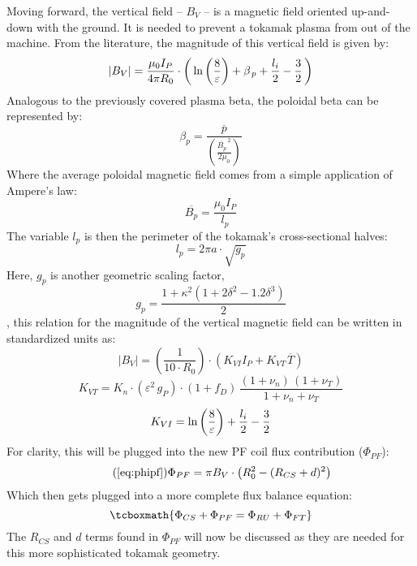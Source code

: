 Moving forward, the vertical field -- $B_V$ -- is a magnetic field oriented up-and-down with the ground. It is needed to prevent a tokamak plasma from  out of the machine. From the literature, the magnitude of this vertical field  is given by:\cite{process}
\begin{equation}
  |B_V| = \frac{\mu_0 I_P}{4 \pi R_0} \cdot \left( \,\textnormal{ln} \left(\frac{8}{\varepsilon}\right) + \beta_{\,p} + \frac{l_i}{2} - \frac{3}{2} \, \right)
\end{equation}
Analogous to the previously covered plasma beta, the poloidal beta can be represented by: \cite{elongation}
\begin{equation}
  \beta_p = \frac{\overline{p}}{\left( \frac{\overline{B_p}^{\,2}}{2 \mu_0} \right)}
\end{equation}
Where the average poloidal magnetic field comes from a simple application of Ampere's law:
\begin{equation}
	\overline{B_p} = \frac{\mu_0 I_P}{l_p}
\end{equation}
The variable $l_p$ is then the perimeter of the tokamak's cross-sectional halves:
\begin{equation}
	l_p = 2 \pi a \cdot \sqrt{g_p}
\end{equation}
Here, $g_p$ is another geometric scaling factor,
\begin{equation}
  g_p = \frac{1 + \kappa^2 ( 1 + 2 \delta^2 - 1.2\delta^3 )}{2}
\end{equation}
, this relation for the magnitude of the vertical magnetic field can be written in standardized units as:
\begin{equation}
	|B_V| = \left( \frac{ 1 }{ 10 \cdot R_0} \right) \cdot \left( K_{VI} I_P +  K_{VT\,} \overline{T}  \right)
\end{equation}
\begin{equation}
	K_{VT} = K_{n} \cdot ( \varepsilon ^ 2 \, g_P ) \cdot ( 1 + f_D ) \, \frac{ (1 + \nu_n) \, (1 + \nu_T) }{1 + \nu_n + \nu_T }
\end{equation}
\begin{equation}
	K_{VI} = \textnormal{ln} \left(\frac{8}{\varepsilon}\right) + \frac{l_i}{2} - \frac{3}{2}
\end{equation}
For clarity, this will be plugged into the new PF coil flux contribution ($\Phi_{PF}$):
\begin{equation}
	\tag{\ref{eq:phipf}}
	\Phi_{PF} = \pi B_V \cdot \left( R_0^2 - ( R_{CS} + d ) ^ 2 \right)
\end{equation}
Which then gets plugged into a more complete flux balance equation:
\begin{equation}
	\label{eq:full_ibal}
	\tcboxmath{
		\Phi_{CS} + \Phi_{PF} = \Phi_{RU} + \Phi_{FT}
	}
\end{equation}
The $R_{CS}$ and $d$ terms found in $\Phi_{PF}$ will now be discussed as they are needed for this more sophisticated tokamak geometry.

